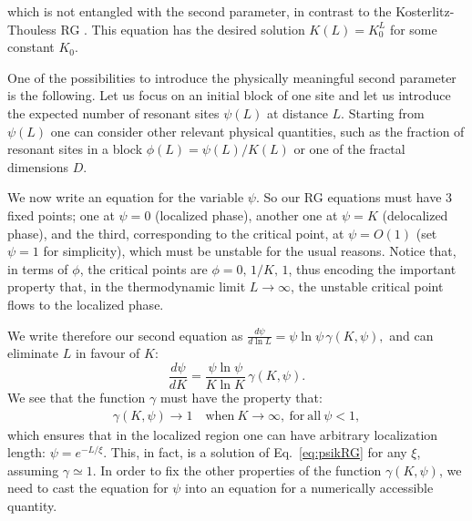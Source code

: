 \documentclass[reprint,aps,prl,superscriptaddress,english,nolongbibliography]{revtex4-2}
\begin{document}
{which is not entangled with the second parameter, in contrast to the Kosterlitz-Thouless RG \cite{1971JETP...32..493B,1972JETP...34..610B,1973JPhC....6.1181K}.
This equation has the desired solution $K(L)=K_0^L$ for some constant $K_0$.

One of the possibilities to introduce the physically meaningful second parameter is the following. Let us focus on an initial block of one site and let us introduce the expected number of resonant sites $\psi(L)$ at distance $L$. 
Starting from $\psi(L)$ one can consider other relevant physical quantities, such as the fraction of resonant sites in a block $\phi(L)=\psi(L)/K(L)$ or one of the fractal dimensions $D$. 

We now write an equation for the variable $\psi$. 
So our RG equations must have 3 fixed points; one at $\psi=0$ (localized phase), another one at $\psi=K$ (delocalized phase), and the third, corresponding to the critical point, at $\psi=O(1)$ (set $\psi=1$ for simplicity), which must be unstable for the usual reasons. 
Notice that, in terms of $\phi$, the critical points are $\phi = 0,\, 1/K, \, 1$, thus encoding the important property that, in the thermodynamic limit $L \to \infty$, the unstable critical point flows to the localized phase.

We write therefore our second equation as $\frac{d\psi}{d\ln L}=\psi\ln \psi \, \gamma(K,\psi),$ and can eliminate $L$ in favour of $K$:
\begin{equation}
    \frac{d\psi}{dK}=\frac{\psi\ln \psi}{K\ln K} \, \gamma(K,\psi).
    \label{eq:psikRG}
\end{equation}
We see that the function $\gamma$ must have the property that:
\begin{eqnarray}
    \gamma(K,\psi)\to 1\quad \mathrm{when\ } K\to\infty,\ \mathrm{for\ all\ }\psi<1,
\end{eqnarray}
which ensures that in the localized region one can have arbitrary localization length: $\psi=e^{-L/\xi}$. This, in fact, is a solution of Eq.~\eqref{eq:psikRG} for any $\xi$, assuming $\gamma\simeq 1$. 
In order to fix the other properties of the function $\gamma(K,\psi)$, we need to cast the equation for $\psi$ into an equation for a numerically accessible quantity. 

}
\end{document}
